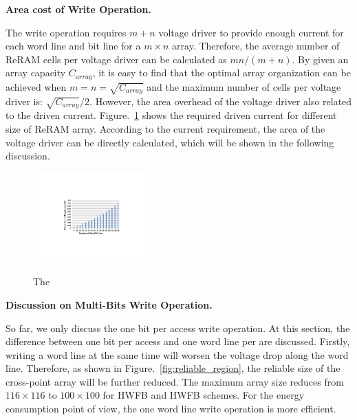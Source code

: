 \vspace{10pt} \textbf{Area cost of Write Operation.} \vspace{8pt}

The write operation requires $m+n$ voltage driver to provide enough current for each word line and bit line for a $m{\times}n$ array.
Therefore, the average number of ReRAM cells per voltage driver can be
calculated as $mn/(m+n)$. By given an array capacity $C_{array}$, it is
easy to find that the optimal array organization can be achieved when
$m=n=\sqrt{C_{array}}$ and the maximum number of cells per voltage driver
is: $\sqrt{C_{array}}/2$. However, the area overhead of the voltage driver also related to the driven current. Figure.~\ref{fig:w_current} shows the required driven current for different size of ReRAM array. According to the current requirement, the area of the voltage driver can be directly calculated, which will be shown in the following discussion.

\begin{figure}%
\centering
  \includegraphics[width=0.4\textwidth]{./figures/w_current2.pdf}\\
  \caption{The }\label{fig:w_current}
\end{figure}

\vspace{10pt} \textbf{Discussion on Multi-Bits Write Operation.} \vspace{8pt}

So far, we only discuss the one bit per access write operation. At this section, the difference between one bit per access and one word line per are discussed. Firstly, writing a word line at the same time will worsen the voltage drop along the word line. Therefore, as shown in Figure.~\ref{fig:reliable_region}, the reliable size of the cross-point array will be further reduced. The maximum array size reduces from $116{\times}116$ to $100{\times}100$ for HWFB and HWFB schemes. For the energy consumption point of view, the one word line write operation is more efficient.


